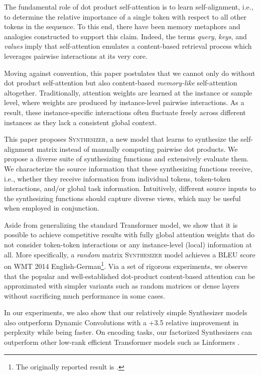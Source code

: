 \documentclass{article} \usepackage{iclr2021_conference,times}
\begin{document}
The fundamental role of dot product self-attention is to learn self-alignment, i.e., to determine the relative importance of a single token with respect to all other tokens in the sequence. To this end, there have been memory metaphors and analogies constructed to support this claim. Indeed, the terms \textit{query}, \textit{keys}, and \textit{values} imply that self-attention emulates a content-based retrieval process which leverages pairwise interactions at its very core. 

Moving against convention, this paper postulates that we cannot only do without dot product self-attention but also content-based \textit{memory-like} self-attention altogether. Traditionally, attention weights are learned at the instance or sample level, where weights are produced by instance-level pairwise interactions. As a result, these instance-specific interactions often fluctuate freely across different instances as they lack a consistent global context.
 
This paper proposes \textsc{Synthesizer}, a new model that learns to synthesize the self-alignment matrix instead of manually computing pairwise dot products. We propose a diverse suite of synthesizing functions and extensively evaluate them. We characterize the source information that these synthesizing functions receive, i.e., whether they receive information from individual tokens, token-token interactions, and/or global task information. Intuitively, different source inputs to the synthesizing functions should capture diverse views, which may be useful when employed in conjunction.
 
Aside from generalizing the standard Transformer model, we show that it is possible to achieve competitive results with fully global attention weights that do not consider token-token interactions or any instance-level (local) information at all. More specifically, a \emph{random} matrix \textsc{Synthesizer} model achieves a  BLEU score on WMT 2014 English-German\footnote{The originally reported result is .}. Via a set of rigorous experiments, we observe that the popular and well-established dot-product content-based attention can be approximated with simpler variants such as random matrices or dense layers without sacrificing much performance in some cases. 

In our experiments, we also show that our relatively simple Synthesizer models also outperform Dynamic Convolutions \citep{wu2019pay} with a +3.5 relative improvement in perplexity while being  faster. On encoding tasks, our factorized Synthesizers can outperform other low-rank efficient Transformer models such as Linformers \citep{wang2020linformer}.
\end{document}
